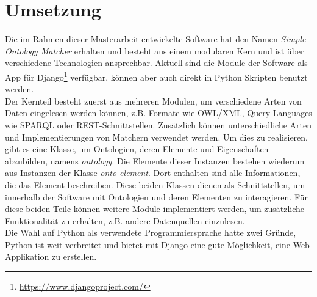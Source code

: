 %
\chapter{Umsetzung}
\label{chap:implementation}
		
		Die im Rahmen dieser Masterarbeit entwickelte Software hat den Namen
		\textit{Simple Ontology Matcher} erhalten und besteht aus einem modularen Kern
		und ist über verschiedene Technologien ansprechbar. Aktuell sind die Module
		der Software als App für Django\footnote{\url{https://www.djangoproject.com/}} verfügbar, können
		aber auch direkt in Python Skripten benutzt werden.\\
		Der Kernteil besteht zuerst aus mehreren Modulen, um verschiedene Arten von
		Daten eingelesen werden können, z.B.
		Formate wie OWL/XML, Query Languages wie SPARQL oder REST-Schnittstellen.
		Zusätzlich können unterschiedliche Arten und Implementierungen von Matchern
		verwendet werden. Um dies zu realisieren, gibt es eine Klasse, um Ontologien,
		deren Elemente und Eigenschaften abzubilden, namens \textit{ontology}.
		Die Elemente dieser Instanzen bestehen wiederum aus Instanzen der Klasse
		\textit{onto element}. Dort enthalten sind alle Informationen, die das Element
		beschreiben. Diese beiden Klassen dienen als Schnittstellen, um innerhalb der
		Software mit Ontologien und deren Elementen zu interagieren. Für diese beiden
		Teile können weitere Module implementiert werden, um zusätzliche
		Funktionalität zu erhalten, z.B. andere Datenquellen einzulesen.\\
		Die Wahl auf Python als verwendete Programmiersprache hatte zwei Gründe,
		Python ist weit verbreitet und bietet mit Django eine gute Möglichkeit, eine
		Web Applikation zu erstellen.
		
